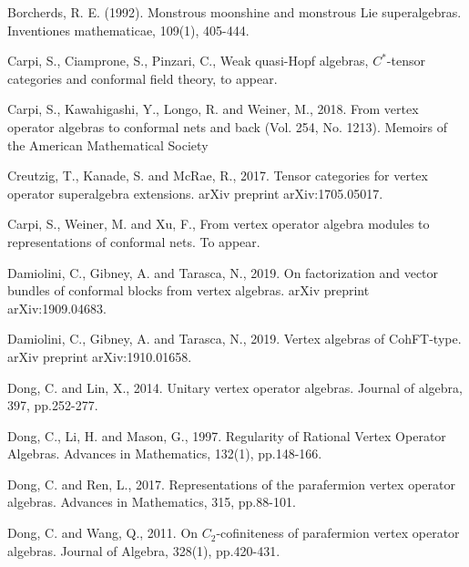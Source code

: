 \documentclass[11pt,b5paper,notitlepage]{article}
\theoremstyle{definition}
\theoremstyle{plain}
\numberwithin{equation}{subsection}
\begin{document}
\begin{thebibliography}{999999}
Borcherds, R. E. (1992). Monstrous moonshine and monstrous Lie superalgebras. Inventiones mathematicae, 109(1), 405-444.

Carpi, S., Ciamprone, S., Pinzari, C., Weak quasi-Hopf algebras, $C^*$-tensor categories and conformal field theory, to appear.

Carpi, S., Kawahigashi, Y., Longo, R. and Weiner, M., 2018. From vertex operator algebras to conformal nets and back (Vol. 254, No. 1213). Memoirs of the American Mathematical Society

Creutzig, T., Kanade, S. and McRae, R., 2017. Tensor categories for vertex operator superalgebra extensions. arXiv preprint arXiv:1705.05017.

Carpi, S., Weiner, M. and Xu, F., From vertex operator algebra modules to representations of conformal nets. To appear.

Damiolini, C., Gibney, A. and Tarasca, N., 2019. On factorization and vector bundles of conformal blocks from vertex algebras. arXiv preprint arXiv:1909.04683.

Damiolini, C., Gibney, A. and Tarasca, N., 2019. Vertex algebras of CohFT-type. arXiv preprint arXiv:1910.01658.

Dong, C. and Lin, X., 2014. Unitary vertex operator algebras. Journal of algebra, 397, pp.252-277.

Dong, C., Li, H. and Mason, G., 1997. Regularity of Rational Vertex Operator Algebras. Advances in Mathematics, 132(1), pp.148-166.



Dong, C. and Ren, L., 2017. Representations of the parafermion vertex operator algebras. Advances in Mathematics, 315, pp.88-101.

Dong, C. and Wang, Q., 2011. On $C_2$-cofiniteness of parafermion vertex operator algebras. Journal of Algebra, 328(1), pp.420-431.


\end{thebibliography}
\end{document}
